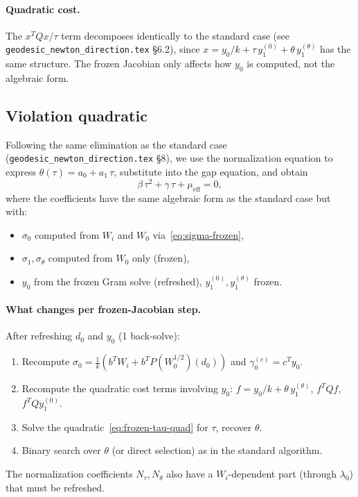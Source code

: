 \documentclass{article}
\begin{document}
\paragraph{Quadratic cost.}
The $x^TQx/\tau$ term decomposes identically to the standard case
(see \texttt{geodesic\_newton\_direction.tex} \S6.2), since
$x = y_0/k + \tau\,y_1^{(0)} + \theta\,y_1^{(\theta)}$ has the same
structure.  The frozen Jacobian only affects how $y_0$ is computed,
not the algebraic form.

\subsection{Violation quadratic}

Following the same elimination as the standard case
(\texttt{geodesic\_newton\_direction.tex} \S8), we use the normalization
equation to express $\theta(\tau) = a_0 + a_1\,\tau$, substitute into
the gap equation, and obtain
\begin{equation}\label{eq:frozen-tau-quad}
  \beta\,\tau^2 + \gamma\,\tau + \mu_{\text{eff}} = 0,
\end{equation}
where the coefficients have the same algebraic form as the standard case
but with:
\begin{itemize}
  \item $\sigma_0$ computed from $W_i$ and $W_0$ via~\eqref{eq:sigma-frozen},
  \item $\sigma_1, \sigma_\theta$ computed from $W_0$ only (frozen),
  \item $y_0$ from the frozen Gram solve (refreshed), $y_1^{(0)},
    y_1^{(\theta)}$ frozen.
\end{itemize}

\paragraph{What changes per frozen-Jacobian step.}
After refreshing $d_0$ and $y_0$ (1 back-solve):
\begin{enumerate}
  \item Recompute $\sigma_0 = \frac{1}{k}(b^T W_i + b^T P(W_0^{1/2})(d_0))$
    and $\gamma_0^{(c)} = c^T y_0$.
  \item Recompute the quadratic cost terms involving $y_0$:
    $f = y_0/k + \theta\,y_1^{(\theta)}$, $f^TQf$, $f^TQy_1^{(0)}$.
  \item Solve the quadratic~\eqref{eq:frozen-tau-quad} for $\tau$,
    recover $\theta$.
  \item Binary search over $\theta$ (or direct selection) as in the
    standard algorithm.
\end{enumerate}
The normalization coefficients $N_\tau, N_\theta$ also have a $W_i$-dependent
part (through $\lambda_0$) that must be refreshed.
\end{document}
